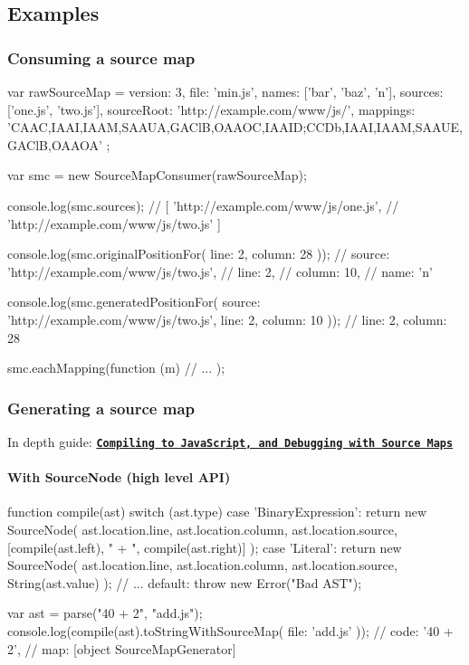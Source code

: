 \subsection*{Examples}

\subsubsection*{Consuming a source map}

\begin{DoxyVerb}var rawSourceMap = {
  version: 3,
  file: 'min.js',
  names: ['bar', 'baz', 'n'],
  sources: ['one.js', 'two.js'],
  sourceRoot: 'http://example.com/www/js/',
  mappings: 'CAAC,IAAI,IAAM,SAAUA,GAClB,OAAOC,IAAID;CCDb,IAAI,IAAM,SAAUE,GAClB,OAAOA'
};

var smc = new SourceMapConsumer(rawSourceMap);

console.log(smc.sources);
// [ 'http://example.com/www/js/one.js',
//   'http://example.com/www/js/two.js' ]

console.log(smc.originalPositionFor({
  line: 2,
  column: 28
}));
// { source: 'http://example.com/www/js/two.js',
//   line: 2,
//   column: 10,
//   name: 'n' }

console.log(smc.generatedPositionFor({
  source: 'http://example.com/www/js/two.js',
  line: 2,
  column: 10
}));
// { line: 2, column: 28 }

smc.eachMapping(function (m) {
  // ...
});
\end{DoxyVerb}


\subsubsection*{Generating a source map}

In depth guide\+: \href{https://hacks.mozilla.org/2013/05/compiling-to-javascript-and-debugging-with-source-maps/}{\tt {\bfseries Compiling to Java\+Script, and Debugging with Source Maps}}

\paragraph*{With Source\+Node (high level A\+PI)}

\begin{DoxyVerb}function compile(ast) {
  switch (ast.type) {
  case 'BinaryExpression':
    return new SourceNode(
      ast.location.line,
      ast.location.column,
      ast.location.source,
      [compile(ast.left), " + ", compile(ast.right)]
    );
  case 'Literal':
    return new SourceNode(
      ast.location.line,
      ast.location.column,
      ast.location.source,
      String(ast.value)
    );
  // ...
  default:
    throw new Error("Bad AST");
  }
}

var ast = parse("40 + 2", "add.js");
console.log(compile(ast).toStringWithSourceMap({
  file: 'add.js'
}));
// { code: '40 + 2',
//   map: [object SourceMapGenerator] }
\end{DoxyVerb}


